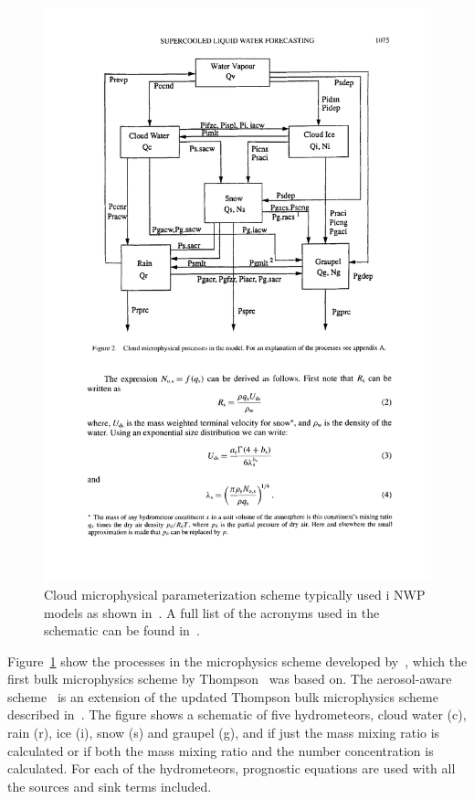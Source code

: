 \begin{figure}
\centering
\includegraphics[scale=0.8]{model_methods/microphysics.pdf}
\caption{Cloud microphysical parameterization scheme typically used i NWP models as shown in~\citet{Reisner1998}. A full list of the acronyms used in the schematic can be found in~\citet{Reisner1998}.}
\label{fig:microphysics}
\end{figure}

Figure~\ref{fig:microphysics} show the processes in the microphysics scheme developed by~\citet{Reisner1998}, which the first bulk microphysics scheme by Thompson~\citep{Thompson2004} was based on. The aerosol-aware scheme~\citep{Thompson2014} is an extension of the updated Thompson bulk microphysics scheme described in~\citet{Thompson2008}. The figure shows a schematic of five hydrometeors, cloud water (c), rain (r), ice (i), snow (s) and graupel (g), and if just the mass mixing ratio is calculated or if both the mass mixing ratio and the number concentration is calculated. For each of the hydrometeors, prognostic equations are used with all the sources and sink terms included.%
%

